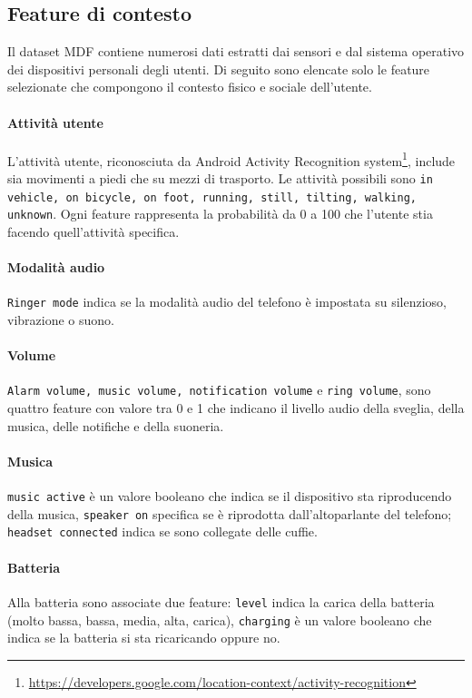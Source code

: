 \documentclass[12pt,italian]{report}
\begin{document}
\subsection{Feature di contesto}
Il dataset MDF contiene numerosi dati estratti dai sensori e dal sistema operativo dei dispositivi personali degli utenti. Di seguito sono elencate solo le feature selezionate che compongono il contesto fisico e sociale dell'utente.

\paragraph{Attività utente}  L'attività utente, riconosciuta da
 Android Activity Recognition system\footnote{\url{https://developers.google.com/location-context/activity-recognition}},
include sia movimenti a piedi che su mezzi di trasporto. Le attività
possibili sono \texttt{in vehicle, on bicycle, on foot, running, still, tilting, walking, unknown}. Ogni feature rappresenta la probabilità da 0 a 100 che l'utente stia facendo quell'attività specifica.

\paragraph{Modalità audio} \texttt{Ringer mode} indica se la modalità audio del telefono è impostata su silenzioso, vibrazione o suono.

\paragraph{Volume} \texttt{Alarm volume, music volume, notification volume} e \texttt{ring volume}, sono quattro feature con valore tra 0 e 1 che indicano il livello audio della sveglia, della musica, delle notifiche e della suoneria.

\paragraph{Musica} \texttt{music active} è un valore booleano che indica se il dispositivo sta riproducendo della musica, \texttt{speaker on} specifica se è riprodotta dall'altoparlante del telefono; \texttt{headset connected} indica se sono collegate delle cuffie.

\paragraph{Batteria} Alla batteria sono associate due feature: \texttt{level} indica la carica della batteria (molto bassa, bassa, media, alta, carica), \texttt{charging} è un valore booleano che indica se la batteria si sta ricaricando oppure no.
\end{document}
